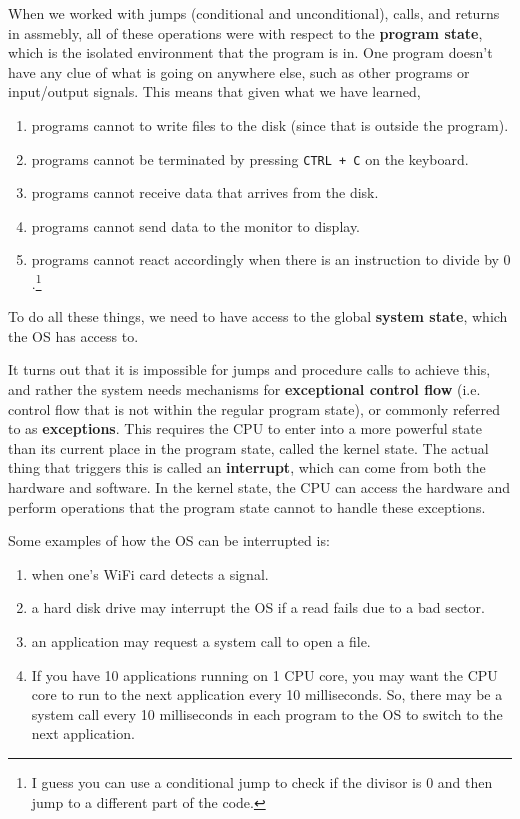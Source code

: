 \documentclass{article}
\begin{document}
    When we worked with jumps (conditional and unconditional), calls, and returns in assmebly, all of these operations were with respect to the \textbf{program state}, which is the isolated environment that the program is in. One program doesn't have any clue of what is going on anywhere else, such as other programs or input/output signals. This means that given what we have learned, 
    \begin{enumerate}
      \item programs cannot to write files to the disk (since that is outside the program). 
      \item programs cannot be terminated by pressing \texttt{CTRL + C} on the keyboard. 
      \item programs cannot receive data that arrives from the disk. 
      \item programs cannot send data to the monitor to display. 
      \item programs cannot react accordingly when there is an instruction to divide by $0$.\footnote{I guess you can use a conditional jump to check if the divisor is $0$ and then jump to a different part of the code.}
    \end{enumerate}
    To do all these things, we need to have access to the global \textbf{system state}, which the OS has access to. 

    It turns out that it is impossible for jumps and procedure calls to achieve this, and rather the system needs mechanisms for \textbf{exceptional control flow} (i.e. control flow that is not within the regular program state), or commonly referred to as \textbf{exceptions}. This requires the CPU to enter into a more powerful state than its current place in the program state, called the kernel state. The actual thing that triggers this is called an \textbf{interrupt}, which can come from both the hardware and software. In the kernel state, the CPU can access the hardware and perform operations that the program state cannot to handle these exceptions. 

    \begin{example}[Interrupts]
      Some examples of how the OS can be interrupted is: 
      \begin{enumerate}
        \item when one's WiFi card detects a signal. 
        \item a hard disk drive may interrupt the OS if a read fails due to a bad sector. 
        \item an application may request a system call to open a file. 
        \item If you have 10 applications running on 1 CPU core, you may want the CPU core to run to the next application every 10 milliseconds. So, there may be a system call every 10 milliseconds in each program to the OS to switch to the next application. 
      \end{enumerate}
    \end{example}
\end{document}

